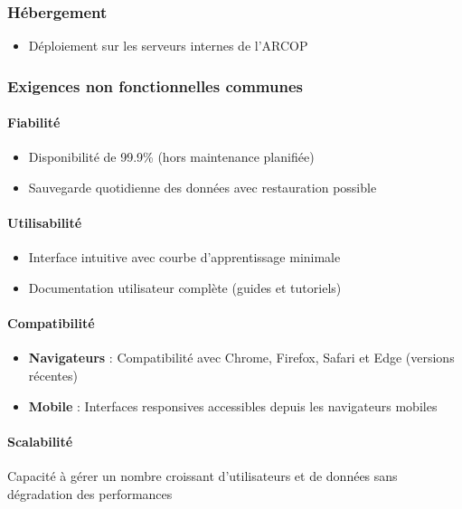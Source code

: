 \subsubsection{Hébergement}
\begin{itemize}
    \item Déploiement sur les serveurs internes de l'ARCOP
\end{itemize}

\subsubsection{Exigences non fonctionnelles communes}
\paragraph{Fiabilité}
\begin{itemize}
    \item Disponibilité de 99.9\% (hors maintenance planifiée)
    \item Sauvegarde quotidienne des données avec restauration possible
\end{itemize}

\paragraph{Utilisabilité}
\begin{itemize}
    \item Interface intuitive avec courbe d'apprentissage minimale
    \item Documentation utilisateur complète (guides et tutoriels)
\end{itemize}

\paragraph{Compatibilité}
\begin{itemize}
    \item \textbf{Navigateurs} : Compatibilité avec Chrome, Firefox, Safari et Edge (versions récentes)
    \item \textbf{Mobile} : Interfaces responsives accessibles depuis les navigateurs mobiles
\end{itemize}

\paragraph{Scalabilité}
Capacité à gérer un nombre croissant d'utilisateurs et de données sans dégradation des performances

